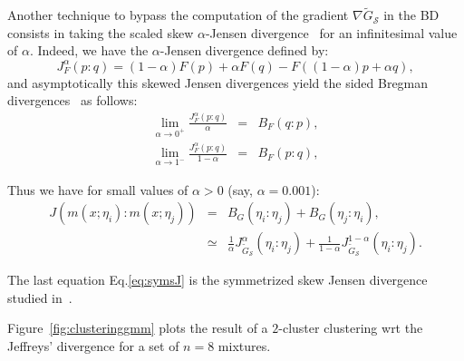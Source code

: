 \documentclass[graybox]{svmult}
\def\tildeG{\tilde{G}}
\def\calS{\mathcal{S}}
\begin{document}
Another technique to bypass the computation of the gradient $\nabla\tildeG_\calS$ in the BD consists in taking the scaled skew $\alpha$-Jensen divergence~\cite{BR-2011}  for an infinitesimal value of $\alpha$.
Indeed, we have the $\alpha$-Jensen divergence defined by:
\begin{equation}\label{eq:jf}
J_F^\alpha(p:q)=(1-\alpha)F(p)+\alpha F(q)-F((1-\alpha)p+\alpha q), 
\end{equation}
and asymptotically this skewed Jensen divergences yield the sided Bregman divergences~\cite{BR-2011} as follows:
\begin{eqnarray}
\lim_{\alpha\rightarrow 0^+} \frac{J_F^\alpha(p:q)}{\alpha}&=& B_F(q:p),\\
\lim_{\alpha\rightarrow 1^-} \frac{ J_F^\alpha(p:q)}{1-\alpha}&=& B_F(p:q),
\end{eqnarray}

Thus we have for small values of $\alpha>0$ (say, $\alpha=0.001$):
\begin{eqnarray}
J(m(x;\eta_i):m(x;\eta_j)) &=& B_G(\eta_i:\eta_j)+B_G(\eta_j:\eta_i),\\
&\simeq & \frac{1}{\alpha} J_{\tildeG_\calS}^\alpha(\eta_i:\eta_j) +  \frac{1}{1-\alpha} J_{\tildeG_\calS}^{1-\alpha}(\eta_i:\eta_j).\label{eq:symsJ}
\end{eqnarray}

The last equation Eq.\ref{eq:symsJ} is the symmetrized skew Jensen divergence studied in~\cite{nielsen-2010}.

Figure~\ref{fig:clusteringgmm} plots the result of a $2$-cluster clustering wrt the Jeffreys' divergence for a set of $n=8$ mixtures.


\end{document}
